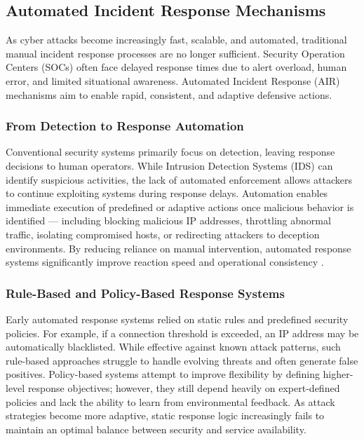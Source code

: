 \documentclass[conference]{IEEEtran}
\begin{document}
\subsection{Automated Incident Response Mechanisms}

As cyber attacks become increasingly fast, scalable, and automated,
traditional manual incident response processes are no longer sufficient.
Security Operation Centers (SOCs) often face delayed response times due to
alert overload, human error, and limited situational awareness.
Automated Incident Response (AIR) mechanisms aim to enable rapid, consistent,
and adaptive defensive actions.

\subsubsection{From Detection to Response Automation}
Conventional security systems primarily focus on detection, leaving response
decisions to human operators. While Intrusion Detection Systems (IDS) can
identify suspicious activities, the lack of automated enforcement allows
attackers to continue exploiting systems during response delays. Automation
enables immediate execution of predefined or adaptive actions once malicious
behavior is identified --- including blocking malicious IP addresses,
throttling abnormal traffic, isolating compromised hosts, or redirecting
attackers to deception environments. By reducing reliance on manual
intervention, automated response systems significantly improve reaction
speed and operational consistency \cite{ring2019survey}.

\subsubsection{Rule-Based and Policy-Based Response Systems}
Early automated response systems relied on static rules and predefined
security policies. For example, if a connection threshold is exceeded, an
IP address may be automatically blacklisted. While effective against known
attack patterns, such rule-based approaches struggle to handle evolving
threats and often generate false positives. Policy-based systems attempt to
improve flexibility by defining higher-level response objectives; however,
they still depend heavily on expert-defined policies and lack the ability
to learn from environmental feedback. As attack strategies become more
adaptive, static response logic increasingly fails to maintain an optimal
balance between security and service availability.
\end{document}
